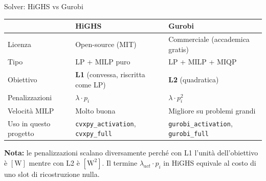 \documentclass[aspectratio=169]{beamer}
\newcommand{\code}[1]{\texttt{\small #1}}
\begin{document}
\begin{frame}{Solver: HiGHS vs Gurobi}
  \small
  \begin{table}
    \renewcommand{\arraystretch}{1.3}
    \begin{tabularx}{\textwidth}{l X X}
      \toprule
      & \textbf{HiGHS} & \textbf{Gurobi} \\
      \midrule
      Licenza & Open-source (MIT) & Commerciale (accademica gratis) \\
      Tipo & LP + MILP puro & LP + MILP + MIQP \\
      Obiettivo & \textbf{L1} (convessa, riscritta come LP) & \textbf{L2} (quadratica) \\
      Penalizzazioni & $\lambda \cdot p_i$ & $\lambda \cdot p_i^2$ \\
      Velocit\`a MILP & Molto buona & Migliore su problemi grandi \\
      Uso in questo progetto & \code{cvxpy\_activation}, \code{cvxpy\_full} & \code{gurobi\_activation}, \code{gurobi\_full} \\
      \bottomrule
    \end{tabularx}
  \end{table}

  \vspace{0.5em}
  \small
  \textbf{Nota:} le penalizzazioni scalano diversamente perch\'e con L1 l'unit\`a
  dell'obiettivo \`e $[\mathrm{W}]$ mentre con L2 \`e $[\mathrm{W}^2]$.
  Il termine $\lambda_{act} \cdot p_i$ in HiGHS equivale al costo di uno slot di ricostruzione nulla.
\end{frame}
\end{document}
